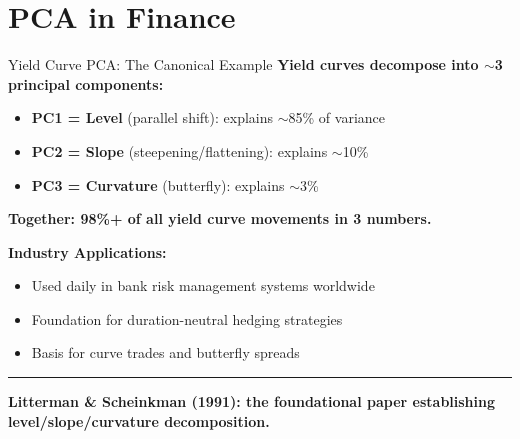 \documentclass[8pt,aspectratio=169]{beamer}
\newcommand{\bottomnote}[1]{%
\vfill
\vspace{-2mm}
\textcolor{mllavender2}{\rule{\textwidth}{0.4pt}}
\vspace{1mm}
\footnotesize
\textbf{#1}
}
\begin{document}
\section{PCA in Finance}

\begin{frame}[t]{Yield Curve PCA: The Canonical Example}
\textbf{Yield curves decompose into $\sim$3 principal components:}
\begin{itemize}
  \item \textbf{PC1 = Level} (parallel shift): explains $\sim$85\% of variance
  \item \textbf{PC2 = Slope} (steepening/flattening): explains $\sim$10\%
  \item \textbf{PC3 = Curvature} (butterfly): explains $\sim$3\%
\end{itemize}

\vspace{0.3em}
\textbf{Together: 98\%+ of all yield curve movements in 3 numbers.}

\vspace{0.3em}
\textbf{Industry Applications:}
\begin{itemize}
  \item Used daily in bank risk management systems worldwide
  \item Foundation for duration-neutral hedging strategies
  \item Basis for curve trades and butterfly spreads
\end{itemize}
\bottomnote{Litterman \& Scheinkman (1991): the foundational paper establishing level/slope/curvature decomposition.}
\end{frame}
\end{document}
